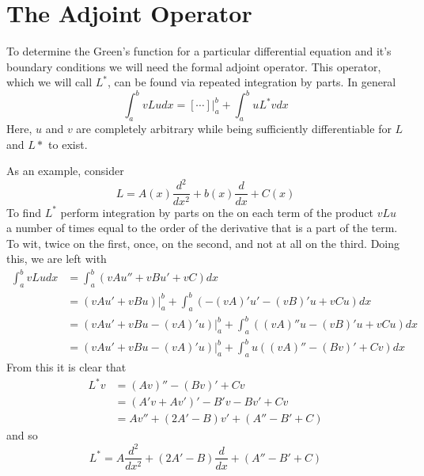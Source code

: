 \section{The Adjoint Operator}
To determine the Green's function for a particular differential equation and it's boundary conditions we will need the formal adjoint operator. This operator, which we will call \(L^*\), can be found via repeated integration by parts. In general
\begin{equation}
	\int_a^b vLu dx = [\cdots]\biggr\rvert_a^b + \int_a^b uL^*v dx
\end{equation}
Here, \(u\) and \(v\) are completely arbitrary while being sufficiently differentiable for \(L\) and \(L*\) to exist. 

As an example, consider
\begin{equation}
	L= A(x) \frac{d^2}{dx^2} + b(x)\frac{d}{dx} + C(x)
\end{equation}
To find \(L^*\) perform integration by parts on the on each term of the product \(vLu\) a number of times equal to the order of the derivative that is a part of the term. To wit, twice on the first, once, on the second, and not at all on the third. Doing this, we are left with
\begin{equation}
	\begin{split}
		\int_a^b vLu dx &= \int_a^b (vAu''+ vBu' + vC)dx\\
		&=(vAu'+vBu)\biggr\rvert_a^b + \int_a^b (-(vA)'u'-(vB)'u+vCu)dx\\
		&=(vAu'+vBu-(vA)'u)\biggr\rvert_a^b + \int_a^b ((vA)''u-(vB)'u+vCu)dx\\
		&=(vAu'+vBu-(vA)'u)\biggr\rvert_a^b + \int_a^b u((vA)''-(Bv)'+Cv)dx
	\end{split}
\end{equation}
From this it is clear that 
\begin{equation}
	\begin{split}
		L^*v &= (Av)''-(Bv)'+Cv\\
		     &= (A'v+Av')'-B'v-Bv'+Cv\\
		     &= Av''+(2A'-B)v'+(A''-B'+C)
	\end{split}
\end{equation}
and so
\begin{equation}
	L^*=A\frac{d^2}{dx^2} + (2A'-B)\frac{d}{dx}+(A''-B'+C)
\end{equation}

